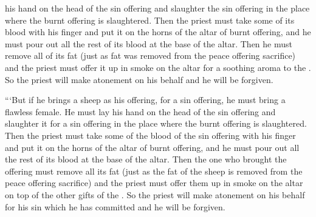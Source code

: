 {his hand
on
the head
of the sin offering
and slaughter
the sin offering
in the place
where the burnt offering is slaughtered.
Then the priest
must take
some of its blood
with his finger
and put
it on
the horns
of the altar
of burnt offering,
and he must
pour
out all
the rest of its blood
at the base
of the altar.
Then he must remove
all
of its fat
(just
as fat
was removed
from the peace offering
sacrifice) and the priest
must offer it up in smoke
on the altar
for a soothing
aroma
to the
{}. So the priest
will make atonement
on
his behalf and he will be forgiven.
\par }{\PP {}“‘But if
he brings
a sheep
as his offering,
for a sin offering,
he must bring
a flawless
female.
He must lay
his hand
on
the head
of the sin offering
and slaughter
it for a sin offering
in the place
where
the
burnt offering
is slaughtered.
Then the priest
must take
some of the blood
of the sin offering
with his finger
and put
it on
the horns
of the altar
of burnt offering,
and he must
pour
out all
the rest of its blood
at the base
of the altar.
Then the one who brought the offering must remove
all
its fat
(just
as the fat
of the sheep
is removed
from the peace offering
sacrifice) and the priest
must offer them
up in smoke
on the altar
on
top of the other gifts
of the {}. So the priest
will make atonement
on
his behalf for his sin
which
he has committed
and he will be forgiven.

}
